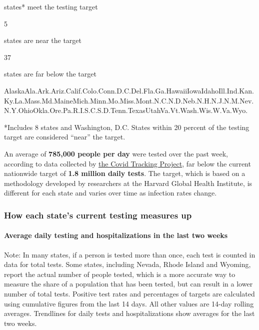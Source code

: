 states* meet the testing target

5

states are near the target

37

states are far below the target

AlaskaAla.Ark.Ariz.Calif.Colo.Conn.D.C.Del.Fla.Ga.HawaiiIowaIdahoIll.Ind.Kan.Ky.La.Mass.Md.MaineMich.Minn.Mo.Miss.Mont.N.C.N.D.Neb.N.H.N.J.N.M.Nev.N.Y.OhioOkla.Ore.Pa.R.I.S.C.S.D.Tenn.TexasUtahVa.Vt.Wash.Wis.W.Va.Wyo.

*Includes 8 states and Washington, D.C. States within 20 percent of the
testing target are considered ``near'' the target.

An average of \textbf{785,000 people per day} were tested over the past
week, according to data collected by
\href{https://covidtracking.com/}{the Covid Tracking Project}, far below
the current nationwide target of \textbf{1.8 million daily tests}. The
target, which is based on a methodology developed by researchers at the
Harvard Global Health Institute, is different for each state and varies
over time as infection rates change.

\hypertarget{how-each-states-current-testing-measures-up}{%
\subsubsection{How each state's current testing measures
up}\label{how-each-states-current-testing-measures-up}}

\hypertarget{average-daily-testing-and-hospitalizations-in-the-last-two-weeks}{%
\paragraph{Average daily testing and hospitalizations in the last two
weeks}\label{average-daily-testing-and-hospitalizations-in-the-last-two-weeks}}

Note: In many states, if a person is tested more than once, each test is
counted in data for total tests. Some states, including Nevada, Rhode
Island and Wyoming, report the actual number of people tested, which is
a more accurate way to measure the share of a population that has been
tested, but can result in a lower number of total tests. Positive test
rates and percentages of targets are calculated using cumulative figures
from the last 14 days. All other values are 14-day rolling averages.
Trendlines for daily tests and hospitalizations show averages for the
last two weeks.

